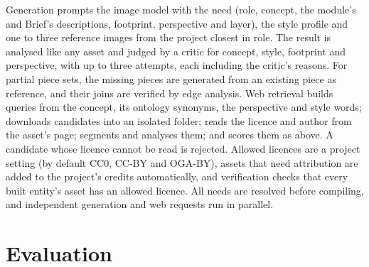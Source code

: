 \documentclass[conference]{IEEEtran}
\begin{document}
Generation prompts the image model with the need (role, concept, the module's and
Brief's descriptions, footprint, perspective and layer), the style profile and one to
three reference images from the project closest in role. The result is analysed like any
asset and judged by a critic for concept, style, footprint and perspective, with up to
three attempts, each including the critic's reasons. For partial piece sets, the missing
pieces are generated from an existing piece as reference, and their joins are verified
by edge analysis. Web retrieval builds queries from the concept, its ontology synonyms,
the perspective and style words; downloads candidates into an isolated folder; reads the
licence and author from the asset's page; segments and analyses them; and scores them as
above. A candidate whose licence cannot be read is rejected. Allowed licences are a
project setting (by default CC0, CC-BY and OGA-BY), assets that need attribution are
added to the project's credits automatically, and verification checks that every built
entity's asset has an allowed licence. All needs are resolved before compiling, and
independent generation and web requests run in parallel.

\section{Evaluation}

\end{document}
